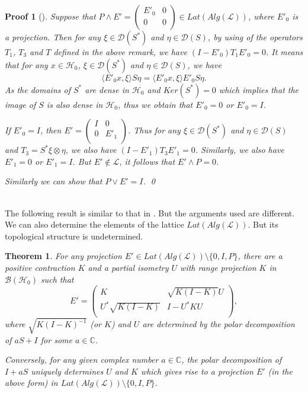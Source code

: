 \documentclass{jaums}
\theoremstyle{thmit} %
\newtheorem{theorem}{Theorem}[section]
\theoremstyle{thmrm} %
\newtheorem*{oldproof}{Proof}
\renewenvironment{proof}[1][{}]{\begin{oldproof}[#1]}{\qed\end{oldproof}}
\begin{document}
\begin{proof} Suppose that $P\wedge E'=\left(
      \begin{array}{cc}
        E'_0   &    0  \\
        0     &    0  \\
      \end{array}
    \right)\in Lat(Alg(\mathcal{L}))$, where $E'_0$ is a projection. Then for
any $\xi\in \mathcal{D}(S^*)$ and
    $\eta\in\mathcal{D}(S)$, by using of the operators $T_1$, $T_3$ and $T$
defined in the above remark,
    we have $(I-E'_0)T_1E'_0=0$. It means that for any $x\in\mathcal{H}_0$,
$\xi\in\mathcal{D}(S^*)$ and $\eta\in\mathcal{D}(S)$, we have
    $$\langle E'_0x,\xi\rangle S\eta=\langle E'_0x,\xi\rangle E'_0S\eta.$$
    As the domains of $S^*$ are dense in $\mathcal{H}_0$ and $Ker(S^*)=0$ which
implies that the image of $S$ is also dense in $\mathcal{H}_0$,
    thus we obtain that $E'_0=0$ or $E'_0=I$.

    If $E'_0=I$, then $E'=\left(
      \begin{array}{cc}
        I     &    0  \\
        0     &    E'_1  \\
      \end{array}
    \right)$. Thus for any $\xi\in \mathcal{D}(S^*)$ and $\eta\in\mathcal{D}(S)$
and
    $T_3=S^*\xi\otimes\eta$, we also have $(I-E'_1)T_3E'_1=0$. Similarly, we
also have $E'_1=0$ or $E'_1=I$. But $E'\notin \mathcal{L}$,
    it follows that $E'\wedge P=0$.

    Similarly we can show that $P\vee E'=I$.
    \end{proof}\\

The following result is similar to that in {\cite{[GY2],[HY]}}. But the
arguments used are different.  We can also determine the elements of the lattice
$Lat(Alg(\mathcal{L}))$. But its topological structure is undetermined.


\begin{theorem} For any projection $E'\in Lat(Alg(\mathcal{L})) \setminus
\{0,I,P\}$, there are a positive contraction $K$ and
a partial isometry $U$ with range projection $K$ in $\mathcal{B}(\mathcal{H}_0)$
such that
$$
E' = \left(
\begin{array}{cc} K & \sqrt{K(I-K)}U  \\
 U^{*}\sqrt{K(I-K)} & I-U^{*}KU     \\
 \end{array}
 \right),
$$
where $\sqrt{K(I-K)^{-1}}$ (or $K$) and $U$ are determined by the
polar decomposition of $aS + I$ for some $a \in \mathbb{C}$.

Conversely, for any given
complex number $a\in \mathbb{C}$, the polar decomposition of $I+aS$ uniquely
determines $U$ and $K$ which gives rise to a projection $E'$
(in the above form)
in $Lat(Alg(\mathcal{L}))\setminus\{0,I,P\}$.
\end{theorem}
\end{document}
